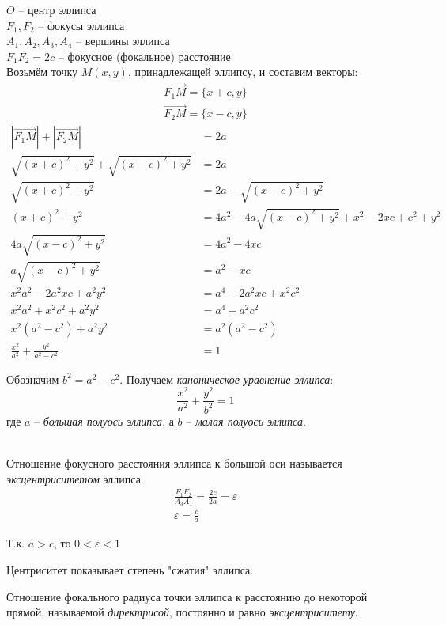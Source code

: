 $O$ -- центр эллипса \\
 $F_1, F_2$ -- фокусы эллипса \\
 $A_1, A_2, A_3, A_4$ -- вершины эллипса \\
$F_1F_2 = 2c$  -- фокусное (фокальное) расстояние\\
Возьмём точку $M(x, y)$, принадлежащей эллипсу, и составим векторы:
\begin{gather*}
  \overrightarrow{F_1M} = \{x + c, y\} \\
  \overrightarrow{F_2M} = \{x - c, y\}
\end{gather*}
\begin{align*}
  |\overrightarrow{F_1M}| + |\overrightarrow{F_2M}| &= 2a \\
  \sqrt{(x + c)^2 + y^2} + \sqrt{(x - c)^2 + y^2} &= 2a \\
  \sqrt{(x + c)^2 + y^2} &= 2a - \sqrt{(x - c)^2 + y^2} \\
  (x + c)^2 + y^2 &= 4a^2 - 4a\sqrt{(x - c)^2 + y^2} + x^2 - 2xc + c^2 + y^2 \\
  4a\sqrt{(x - c)^2 + y^2} &= 4a^2 - 4xc \\
  a\sqrt{(x - c)^2 + y^2} &= a^2 - xc \\
  x^2 a^2 - 2a^2xc + a^2y^2 &= a^4 - 2a^2xc + x^2c^2 \\
  x^2a^2 + x^2c^2 + a^2y^2 &= a^4 - a^2c^2 \\
  x^2(a^2 - c^2) + a^2y^2 &= a^2(a^2 - c^2) \\
  \frac{x^2}{a^2} + \frac{y^2}{a^2 - c^2} &= 1
\end{align*} 

Обозначим $b^2 = a^2 - c^2$. Получаем \textit{каноническое уравнение эллипса}: \[
  \boxed{\frac{x^2}{a^2} + \frac{y^2}{b^2} = 1}
\]  
где $a$ -- \textit{большая полуось эллипса}, а  $b$ -- \textit{малая полуось эллипса}.


\\
Отношение фокусного расстояния эллипса к большой оси называется \textit{эксцентриситетом} эллипса.
\begin{gather*}
  \frac{F_1F_2}{A_3A_1} = \frac{2c}{2a} = \varepsilon \\
  \boxed{\varepsilon = \frac{c}{a}}
\end{gather*}
\begin{note}
  Т.к. $a > c$, то $0 < \varepsilon < 1$
\end{note}

Центриситет показывает степень "сжатия" эллипса.

Отношение фокального радиуса точки эллипса к расстоянию до некоторой прямой, называемой \textit{директрисой}, постоянно и равно \textit{эксцентриситету}. 

